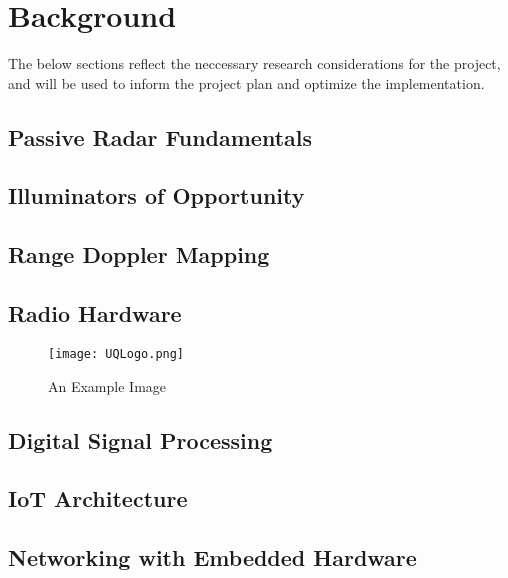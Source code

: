 \chapter{Background \label{sec:background}}

The below sections reflect the neccessary research considerations for the project, and will be used to inform the project plan and optimize the implementation.

\section{Passive Radar Fundamentals}

\section{Illuminators of Opportunity}

\section{Range Doppler Mapping}

\section{Radio Hardware}


\begin{figure}[h]
    \centering
    \texttt{[image: UQLogo.png]}
    \caption{An Example Image}
    \label{fig:uq}
\end{figure}

\section{Digital Signal Processing}

\section{IoT Architecture}

\section{Networking with Embedded Hardware}
\lipsum[14-15]